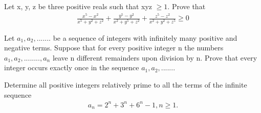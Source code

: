 \item Let x, y, z be three positive reals such that xyz $ \geq 1$. Prove that
\begin{align*}
\frac{x^5-x^2}{x^5 + y^2 + z^2}+\frac{y^5-y^2}{x^2 + y^5 + z^2}+\frac{z^5-z^2}{x^2 + y^2 + z^5}\geq 0
\end{align*}

\item Let $a_1, a_2,$....... be a sequence of integers with infinitely many positive and negative terms. Suppose that for every positive integer n the
numbers $a_1, a_2,........, a_n$ leave n different remainders upon division by n.
Prove that every integer occurs exactly once in the sequence $a_1, a_2,$.......

\item Determine all positive integers relatively prime to all the terms of the infinite sequence
\begin{align*}
a_n = 2^n + 3^n + 6^{n}-1, n\geq 1.
\end{align*}

